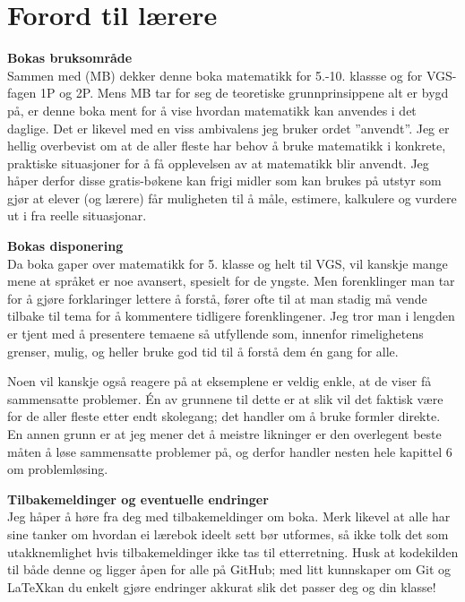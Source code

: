 


\newpage
\section*{Forord til lærere}
\textbf{Bokas bruksområde}\\
Sammen med  (MB) dekker denne boka matematikk for 5.-10. klassse og for VGS-fagen 1P og 2P. Mens MB tar for seg de teoretiske grunnprinsippene alt er bygd på, er denne boka ment for å vise hvordan matematikk kan anvendes i det daglige. Det er likevel med en viss ambivalens jeg bruker ordet ''anvendt''. Jeg er hellig overbevist om at de aller fleste har behov å bruke matematikk i konkrete, praktiske situasjoner for å få opplevelsen av at matematikk blir anvendt. Jeg håper derfor disse gratis-bøkene kan frigi midler som kan brukes på utstyr som gjør at elever (og lærere) får muligheten til å måle, estimere, kalkulere og vurdere ut i fra reelle situasjonar.\vsk

\textbf{Bokas disponering} \\
Da boka gaper over matematikk for 5. klasse og helt til VGS, vil kanskje mange mene at språket er noe avansert, spesielt for de yngste. Men forenklinger man tar for å gjøre forklaringer lettere å forstå, fører ofte til at man stadig må vende tilbake til tema for å kommentere tidligere forenklingener. Jeg tror man i lengden er tjent med å presentere temaene så utfyllende som, innenfor rimelighetens grenser, mulig, og heller bruke god tid til å forstå dem én gang for alle.\vsk

Noen vil kanskje også reagere på at eksemplene er veldig enkle, at de viser få sammensatte problemer. Én av grunnene til dette er at slik vil det faktisk være for de aller fleste etter endt skolegang; det handler om å bruke formler direkte. En annen grunn er at jeg mener det å meistre likninger er den overlegent beste måten å løse sammensatte problemer på, og derfor handler nesten hele kapittel 6 om problemløsing.\vsk

\textbf{Tilbakemeldinger og eventuelle endringer} \\
Jeg håper å høre fra deg med tilbakemeldinger om boka. Merk likevel at alle har sine tanker om hvordan ei lærebok ideelt sett bør utformes, så ikke tolk det som utakknemlighet hvis tilbakemeldinger ikke tas til etterretning. Husk at kodekilden til både denne  og \mb\;ligger åpen for alle på GitHub; med litt kunnskaper om Git og \LaTeX kan du enkelt gjøre endringer akkurat slik det passer deg og din klasse!


